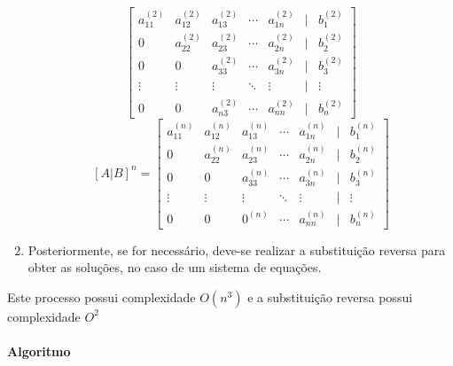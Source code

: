 \documentclass{article}
\begin{document}
\begin{enumerate}[noitemsep]
\[                        \begin{bmatrix}
                            a_{11}^{(2)} & a_{12}^{(2)} & a_{13}^{(2)} & \cdots & a_{1n}^{(2)} & | & b_{1}^{(2)}\\
                            0            & a_{22}^{(2)} & a_{23}^{(2)} & \cdots & a_{2n}^{(2)} & | & b_{2}^{(2)}\\
                            0            & 0            & a_{33}^{(2)} & \cdots & a_{3n}^{(2)} & | & b_{3}^{(2)}\\
                            \vdots       & \vdots       & \vdots       & \ddots & \vdots       & | & \vdots\\
                            0            & 0            & a_{n3}^{(2)} & \cdots & a_{nn}^{(2)} & | & b_{n}^{(2)}
                        \end{bmatrix}
                    \]\vspace{5mm}
                    \[\boxed{[A|B]^{n}=
                        \begin{bmatrix}
                            a_{11}^{(n)} & a_{12}^{(n)} & a_{13}^{(n)} & \cdots & a_{1n}^{(n)} & | & b_{1}^{(n)}\\
                            0            & a_{22}^{(n)} & a_{23}^{(n)} & \cdots & a_{2n}^{(n)} & | & b_{2}^{(n)}\\
                            0            & 0            & a_{33}^{(n)} & \cdots & a_{3n}^{(n)} & | & b_{3}^{(n)}\\
                            \vdots       & \vdots       & \vdots       & \ddots & \vdots       & | & \vdots\\
                            0            & 0            & 0     ^{(n)} & \cdots & a_{nn}^{(n)} & | & b_{n}^{(n)}
                        \end{bmatrix}}
                    \]
                \item Posteriormente, se for necessário, deve-se realizar a substituição reversa para obter as soluções, no caso de um sistema de equações.
            \end{enumerate}
        
        Este processo possui complexidade $O(n^{3})$ e a substituição reversa possui complexidade $O^{2}$

        \paragraph{Algoritmo}
\end{document}
